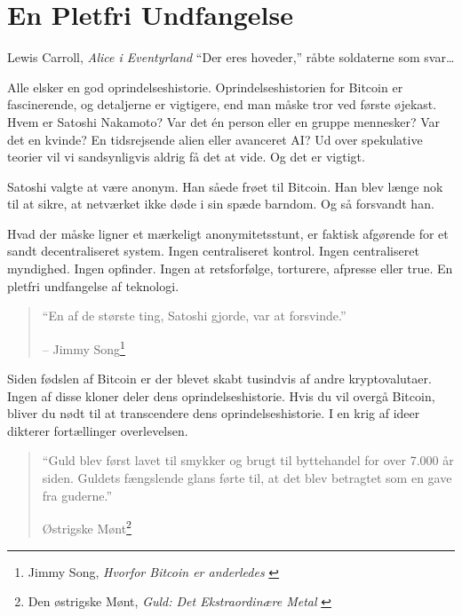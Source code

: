 \chapter{En Pletfri Undfangelse}
\label{les:5}

\begin{chapquote}{Lewis Carroll, \textit{Alice i Eventyrland}}
\enquote{Der eres hoveder,} råbte soldaterne som svar\ldots
\end{chapquote}

Alle elsker en god oprindelseshistorie. Oprindelseshistorien for Bitcoin er fascinerende, og detaljerne er vigtigere, end man måske tror ved første øjekast. Hvem er Satoshi Nakamoto? Var det én person eller en gruppe mennesker? Var det en kvinde? En tidsrejsende alien eller avanceret AI? Ud over spekulative teorier vil vi sandsynligvis aldrig få det at vide. Og det er vigtigt.

Satoshi valgte at være anonym. Han såede frøet til Bitcoin. Han blev længe nok til at sikre, at netværket ikke døde i sin spæde barndom. Og så forsvandt han.

Hvad der måske ligner et mærkeligt anonymitetsstunt, er faktisk afgørende for et sandt decentraliseret system. Ingen centraliseret kontrol. Ingen centraliseret myndighed. Ingen opfinder. Ingen at retsforfølge, torturere, afpresse eller true. En pletfri undfangelse af teknologi.

\begin{quotation}\begin{samepage}
\enquote{En af de største ting, Satoshi gjorde, var at forsvinde.}
\begin{flushright} -- Jimmy Song\footnote{Jimmy Song, \textit{Hvorfor Bitcoin er anderledes} \cite{bitcoin-different}}
\end{flushright}\end{samepage}\end{quotation}

\newpage

Siden fødslen af Bitcoin er der blevet skabt tusindvis af andre kryptovalutaer. Ingen af disse kloner deler dens oprindelseshistorie. Hvis du vil overgå Bitcoin, bliver du nødt til at transcendere dens oprindelseshistorie. I en krig af ideer dikterer fortællinger overlevelsen.

\begin{quotation}\begin{samepage}
\enquote{Guld blev først lavet til smykker og brugt til byttehandel for over 7.000 år siden. Guldets fængslende glans førte til, at det blev betragtet som en gave fra guderne.}
\begin{flushright} Østrigske Mønt\footnote{Den østrigske Mønt, \textit{Guld: Det Ekstraordinære Metal} \cite{gold-gift-gods}}
\end{flushright}\end{samepage}\end{quotation}

